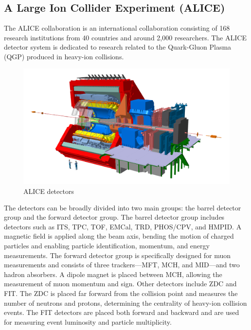         \subsection{A Large Ion Collider Experiment (ALICE)}
        The ALICE collaboration is an international collaboration consisting of 168 research institutions from 40 countries and around 2,000 researchers. The ALICE detector system is dedicated to research related to the Quark-Gluon Plasma (QGP) produced in heavy-ion collisions.
        \begin{figure}[htbp]
            \centering
            \includegraphics[keepaspectratio, scale=0.2]{fig/2_1_ALICE_RUN3_detectors.jpg}
            \caption{ALICE detectors}
            \label{ALICE_detectors}
        \end{figure}
        The detectors can be broadly divided into two main groups: the barrel detector group and the forward detector group.
        The barrel detector group includes detectors such as ITS, TPC, TOF, EMCal, TRD, PHOS/CPV, and HMPID. A magnetic field is applied along the beam axis, bending the motion of charged particles and enabling particle identification, momentum, and energy measurements. The forward detector group is specifically designed for muon measurements and consists of three trackers—MFT, MCH, and MID—and two hadron absorbers. A dipole magnet is placed between MCH, allowing the measurement of muon momentum and sign. Other detectors include ZDC and FIT. The ZDC is placed far forward from the collision point and measures the number of neutrons and protons, determining the centrality of heavy-ion collision events. The FIT detectors are placed both forward and backward and are used for measuring event luminosity and particle multiplicity.

